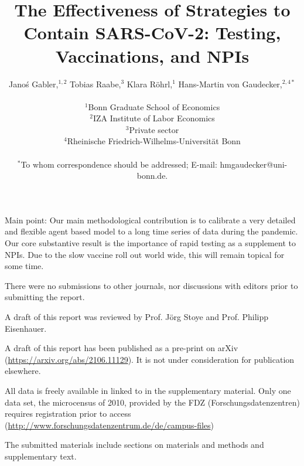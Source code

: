 \documentclass[a4paper, 10pt]{article}
\title{The Effectiveness of Strategies to Contain SARS-CoV-2: Testing, Vaccinations, and NPIs}
\author
{Janoś Gabler,$^{1, 2}$ Tobias Raabe,$^{3}$ Klara Röhrl,$^{1}$ Hans-Martin von Gaudecker,$^{2,4\ast}$\\
\\
\normalsize{$^{1}$Bonn Graduate School of Economics}\\
\normalsize{$^{2}$IZA Institute of Labor Economics}\\
\normalsize{$^{3}$Private sector}\\
\normalsize{$^{4}$Rheinische Friedrich-Wilhelms-Universität Bonn}\\
\\
\normalsize{$^\ast$To whom correspondence should be addressed; E-mail:  hmgaudecker@uni-bonn.de.}
}
\begin{document}
\maketitle

Main point: Our main methodological contribution is to calibrate a very detailed and
flexible agent based model to a long time series of data during the pandemic. Our core
substantive result is the importance of rapid testing as a supplement to NPIs. Due to
the slow vaccine roll out world wide, this will remain topical for some time.

There were no submissions to other journals, nor discussions with editors prior to
submitting the report.

A draft of this report was reviewed by Prof. Jörg Stoye and Prof. Philipp Eisenhauer.

A draft of this report has been published as a pre-print on arXiv
(\url{https://arxiv.org/abs/2106.11129}). It is not under consideration for publication
elsewhere.

All data is freely available in linked to in the supplementary material. Only one data
set, the microcensus of 2010, provided by the FDZ (Forschungsdatenzentren) requires
registration prior to access
(\url{http://www.forschungsdatenzentrum.de/de/campus-files})

The submitted materials include sections on materials and methods and supplementary
text.
\end{document}

